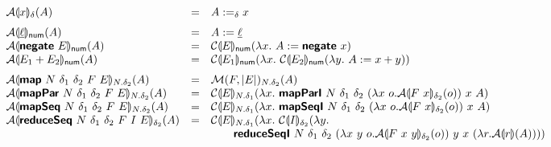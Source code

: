 \begin{figure}[H]
  \begin{displaymath}
    \begin{array}{lcl}
      \semA{x}_\delta(A)
      &=& A :=_\delta x
      \medskip\\

      \semA{\underline{\ell}}_{\num}(A)
      &=& A := \underline{\ell}
      \\
      \semA{\prim{negate}~E}_{\num}(A)
      &=& \semE{E}_{\num}(\lambda x.~A := \prim{negate}~x)
      \\
      \semA{E_1 + E_2}_{\num}(A)
      &=& \semE{E_1}_{\num}(\lambda x.~\semE{E_2}_{\num}(\lambda y.~A := x + y))
      \medskip\\

      \semA{\prim{map}~N~\delta_1~\delta_2~F~E}_{N.\delta_2}(A)
      &=& \semM{F}{E}_{N.\delta_2}(A)
      \\
      \semA{\prim{mapPar}~N~\delta_1~\delta_2~F~E}_{N.\delta_2}(A)
      &=& \semE{E}_{N.\delta_1}(\lambda x.~\prim{mapParI}~N~\delta_1~\delta_2~(\lambda x~o. \semA{F~x}_{\delta_2}(o))~x~A)
      \\
      \semA{\prim{mapSeq}~N~\delta_1~\delta_2~F~E}_{N.\delta_2}(A)
      &=& \semE{E}_{N.\delta_1}(\lambda x.~\prim{mapSeqI}~N~\delta_1~\delta_2~(\lambda x~o. \semA{F~x}_{\delta_2}(o))~x~A)
      \\
      \semA{\prim{reduceSeq}~N~\delta_1~\delta_2~F~I~E}_{\delta_2}(A)
      &=& \begin{array}[t]{@{}l}
            \semE{E}_{N.\delta_1}(\lambda x.~\semE{I}_{\delta_2}(\lambda y.\\
            \quad\quad \prim{reduceSeqI}~N~\delta_1~\delta_2~(\lambda x~y~o. \semA{F~x~y}_{\delta_2}(o))~y~x~(\lambda r. \semA{r}(A))))
          \end{array}
      \medskip\\


\end{array}
\end{displaymath}
\end{figure}
